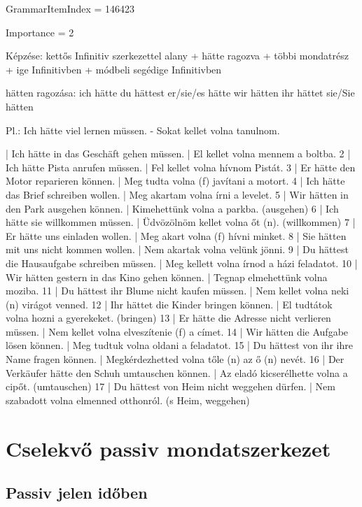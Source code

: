 \documentclass{article}
\newenvironment{desc}{\verbatim}{\endverbatim}
\newenvironment{exmp}{\verbatim}{\endverbatim}
\begin{document}
GrammarItemIndex = 146423

Importance = 2

\begin{desc}
Képzése: kettős Infinitiv szerkezettel
alany + hätte ragozva + többi mondatrész + ige Infinitivben + módbeli segédige Infinitivben

hätten ragozása:
ich hätte
du hättest
er/sie/es hätte
wir hätten
ihr hättet
sie/Sie hätten

Pl.: Ich hätte viel lernen müssen. - Sokat kellet volna tanulnom.
\end{desc}

\begin{exmp}
1 | Ich hätte in das Geschäft gehen müssen. | El kellet volna mennem a boltba.
2 | Ich hätte Pista anrufen müssen. | Fel kellet volna hívnom Pistát.
3 | Er hätte den Motor reparieren können. | Meg tudta volna (f) javítani a motort.
4 | Ich hätte das Brief schreiben wollen. | Meg akartam volna írni a levelet.
5 | Wir hätten in den Park ausgehen können. | Kimehettünk volna a parkba. (ausgehen)
6 | Ich hätte sie willkommen müssen. | Üdvözölnöm kellet volna őt (n). (willkommen)
7 | Er hätte uns einladen wollen. | Meg akart volna (f) hívni minket.
8 | Sie hätten mit uns nicht kommen wollen. | Nem akartak volna velünk jönni.
9 | Du hättest die Hausaufgabe schreiben müssen. | Meg kellett volna írnod a házi feladatot.
10 | Wir hätten gestern in das Kino gehen können. | Tegnap elmehettünk volna moziba.
11 | Du hättest ihr Blume nicht kaufen müssen. | Nem kellet volna neki (n) virágot venned.
12 | Ihr hättet die Kinder bringen können. | El tudtátok volna hozni a gyerekeket. (bringen)
13 | Er hätte die Adresse nicht verlieren müssen. | Nem kellet volna elveszítenie (f) a címet.
14 | Wir hätten die Aufgabe lösen können. | Meg tudtuk volna oldani a feladatot.
15 | Du hättest von ihr ihre Name fragen können. | Megkérdezhetted volna tőle (n) az ő (n) nevét.
16 | Der Verkäufer hätte den Schuh umtauschen können. | Az eladó kicserélhette volna a cipőt. (umtauschen)
17 | Du hättest von Heim nicht weggehen dürfen. | Nem szabadott volna elmenned otthonról. (s Heim, weggehen)
\end{exmp}

\section{Cselekvő passiv mondatszerkezet}

\subsection{Passiv jelen időben}
\end{document}
